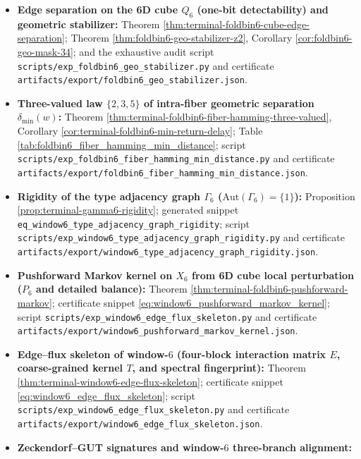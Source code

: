 \begin{itemize}
  Theorem \ref{thm:terminal-foldbin6-fiber-affine-geometry}, Corollary \ref{cor:terminal-foldbin6-no-linear-kernel};
  Table \ref{tab:foldbin6_fiber_affine_geometry};
  script \texttt{scripts/exp\_foldbin6\_fiber\_affine\_geometry.py} and certificate \texttt{artifacts/export/foldbin6\_fiber\_affine\_geometry.json}.
  \item \textbf{Edge separation on the 6D cube \(Q_6\) (one-bit detectability) and geometric stabilizer:}
  Theorem \ref{thm:terminal-foldbin6-cube-edge-separation}; Theorem \ref{thm:foldbin6-geo-stabilizer-z2}, Corollary \ref{cor:foldbin6-geo-mask-34};
  and the exhaustive audit script \texttt{scripts/exp\_foldbin6\_geo\_stabilizer.py} and certificate \texttt{artifacts/export/foldbin6\_geo\_stabilizer.json}.
  \item \textbf{Three-valued law \(\{2,3,5\}\) of intra-fiber geometric separation \(\delta_{\min}(w)\):}
  Theorem \ref{thm:terminal-foldbin6-fiber-hamming-three-valued}, Corollary \ref{cor:terminal-foldbin6-min-return-delay};
  Table \ref{tab:foldbin6_fiber_hamming_min_distance};
  script \texttt{scripts/exp\_foldbin6\_fiber\_hamming\_min\_distance.py} and certificate \texttt{artifacts/export/foldbin6\_fiber\_hamming\_min\_distance.json}.
  \item \textbf{Rigidity of the type adjacency graph \(\Gamma_6\) (\(\mathrm{Aut}(\Gamma_6)=\{1\}\)):}
  Proposition \ref{prop:terminal-gamma6-rigidity};
  generated snippet \texttt{eq\_window6\_type\_adjacency\_graph\_rigidity};
  script \texttt{scripts/exp\_window6\_type\_adjacency\_graph\_rigidity.py} and certificate \texttt{artifacts/export/window6\_type\_adjacency\_graph\_rigidity.json}.
  \item \textbf{Pushforward Markov kernel on \(X_6\) from 6D cube local perturbation (\(P_6\) and detailed balance):}
  Theorem \ref{thm:terminal-foldbin6-pushforward-markov};
  certificate snippet \eqref{eq:window6_pushforward_markov_kernel};
  script \texttt{scripts/exp\_window6\_edge\_flux\_skeleton.py} and certificate \texttt{artifacts/export/window6\_pushforward\_markov\_kernel.json}.
  \item \textbf{Edge--flux skeleton of window-\(6\) (four-block interaction matrix \(E\), coarse-grained kernel \(T\), and spectral fingerprint):}
  Theorem \ref{thm:terminal-window6-edge-flux-skeleton};
  certificate snippet \eqref{eq:window6_edge_flux_skeleton};
  script \texttt{scripts/exp\_window6\_edge\_flux\_skeleton.py} and certificate \texttt{artifacts/export/window6\_edge\_flux\_skeleton.json}.
  \item \textbf{Zeckendorf--GUT signatures and window-\(6\) three-branch alignment:}

\end{itemize}
